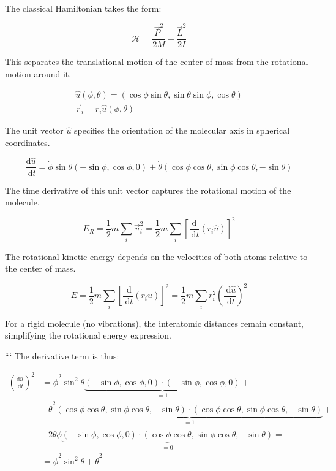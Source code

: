 \documentclass[italian]{HKNdocument}
\begin{document}
The classical Hamiltonian takes the form:

\begin{equation*}
\mathcal{H}=\frac{\vec{P}^{2}}{2 M}+\frac{\vec{L}^{2}}{2 I} \tag{8.63}
\end{equation*}

This separates the translational motion of the center of mass from the rotational motion around it.

\[
\begin{array}{r}
\hat{u}(\phi, \theta)=(\cos \phi \sin \theta, \sin \theta \sin \phi, \cos \theta)  \tag{8.64}\\
\vec{r}_{i}=r_{i} \hat{u}(\phi, \theta)
\end{array}
\]

The unit vector $\hat{u}$ specifies the orientation of the molecular axis in spherical coordinates.

\begin{equation*}
\frac{\mathrm{d} \hat{u}}{\mathrm{~d} t}=\dot{\phi} \sin \theta(-\sin \phi, \cos \phi, 0)+\dot{\theta}(\cos \phi \cos \theta, \sin \phi \cos \theta,-\sin \theta) \tag{8.65}
\end{equation*}

The time derivative of this unit vector captures the rotational motion of the molecule.

\begin{equation*}
E_{R}=\frac{1}{2} m \sum_{i} \vec{v}_{i}^{2}=\frac{1}{2} m \sum_{i}\left[\frac{\mathrm{d}}{\mathrm{~d} t}\left(r_{i} \hat{u}\right)\right]^{2} \tag{8.66}
\end{equation*}

The rotational kinetic energy depends on the velocities of both atoms relative to the center of mass.

\begin{equation*}
E=\frac{1}{2} m \sum_{i}\left[\frac{\mathrm{~d}}{\mathrm{~d} t}\left(r_{i} \hat{u}\right)\right]^{2}=\frac{1}{2} m \sum_{i} r_{i}^{2}\left(\frac{\mathrm{~d} \hat{u}}{\mathrm{~d} t}\right)^{2} \tag{8.67}
\end{equation*}

For a rigid molecule (no vibrations), the interatomic distances remain constant, simplifying the rotational energy expression.

```
The derivative term is thus:

\begin{align*}
\left(\frac{\mathrm{d} \hat{u}}{\mathrm{~d} t}\right)^{2} & =\dot{\phi}^{2} \sin ^{2} \theta \underbrace{(-\sin \phi, \cos \phi, 0) \cdot(-\sin \phi, \cos \phi, 0)}_{=1}+ \\
& +\dot{\theta}^{2} \underbrace{(\cos \phi \cos \theta, \sin \phi \cos \theta,-\sin \theta) \cdot(\cos \phi \cos \theta, \sin \phi \cos \theta,-\sin \theta)}_{=1}+ \\
& +2 \dot{\theta} \dot{\phi} \underbrace{(-\sin \phi, \cos \phi, 0) \cdot(\cos \phi \cos \theta, \sin \phi \cos \theta,-\sin \theta)}_{=0}= \\
& =\dot{\phi}^{2} \sin ^{2} \theta+\dot{\theta}^{2} \tag{8.68}
\end{align*}
\end{document}
